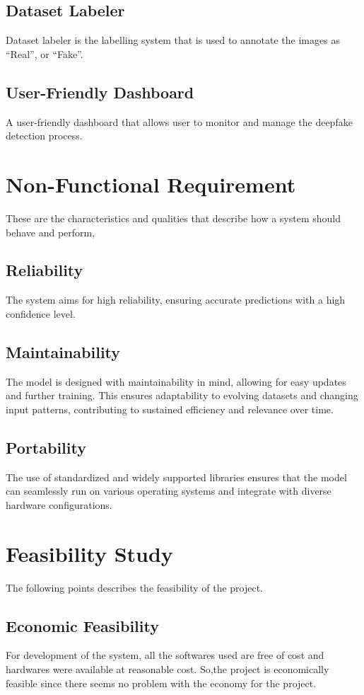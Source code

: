     \subsection{Dataset Labeler}
        Dataset labeler is the labelling system that is used to annotate the images as “Real”, or “Fake”.

    \subsection{User-Friendly Dashboard}
        A user-friendly dashboard that allows user to monitor and manage the deepfake detection process.

\section{Non-Functional Requirement}
    These are the characteristics and qualities that describe how a system should behave and perform,

    \subsection{Reliability}
        The system aims for high reliability, ensuring accurate predictions with a high confidence level.
    \subsection{Maintainability}
        The model is designed with maintainability in mind, allowing for easy updates and further training. This ensures adaptability to evolving datasets and changing input patterns, contributing to sustained efficiency and relevance over time.
    \subsection{Portability}
        The use of standardized and widely supported libraries ensures that the model can seamlessly run on various operating systems and integrate with diverse hardware configurations.
    
\newpage
\section{Feasibility Study}
    The following points describes the feasibility of the project.

    \subsection{Economic Feasibility}
        For development of the system, all the softwares used are free of cost and hardwares were available  at reasonable cost. So,the project is economically feasible since there seems no problem with the economy for the project.

